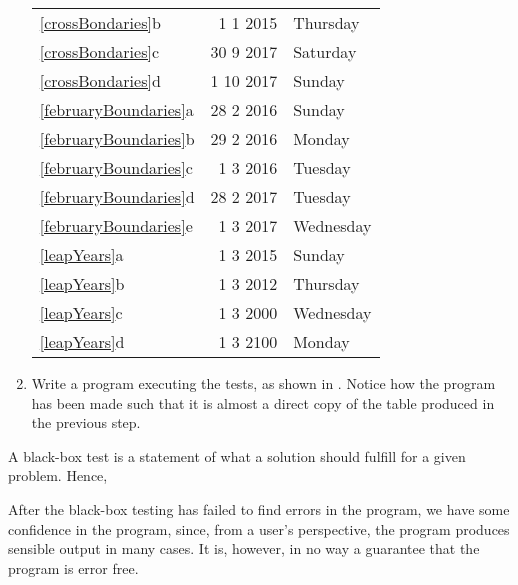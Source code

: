 \documentclass[fsharpnotes.tex]{subfiles}
\begin{document}
\begin{enumerate}
\begin{center}
\begin{tabular}{|l|r|l|}
    \ref{crossBondaries}b&1 1 2015&Thursday\\
    \ref{crossBondaries}c&30 9 2017&Saturday\\
    \ref{crossBondaries}d&1 10 2017&Sunday\\
    \hline
    \ref{februaryBoundaries}a&28 2 2016&Sunday\\
    \ref{februaryBoundaries}b&29 2 2016&Monday\\
    \ref{februaryBoundaries}c&1 3 2016&Tuesday\\
    \ref{februaryBoundaries}d&28 2 2017&Tuesday\\
    \ref{februaryBoundaries}e&1 3 2017&Wednesday\\
    \hline
    \ref{leapYears}a&1 3 2015&Sunday\\
    \ref{leapYears}b&1 3 2012&Thursday\\
    \ref{leapYears}c&1 3 2000&Wednesday\\
    \ref{leapYears}d&1 3 2100&Monday\\
    \hline
  \end{tabular}
\end{center}
\item Write a program executing the tests, as shown in .
% 
%
%
Notice how the program has been made such that it is almost a direct copy of the table produced in the previous step.
\end{enumerate}
A black-box test is a statement of what a solution should fulfill for a given problem. Hence, 

After the black-box testing has failed to find errors in the program, we have some confidence in the program, since, from a user's perspective, the program produces sensible output in many cases. It is, however, in no way a guarantee that the program is error free.
\end{document}
